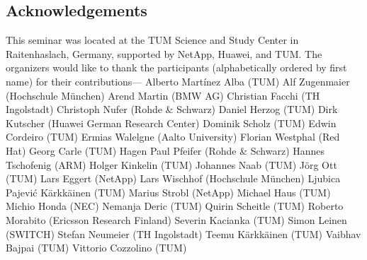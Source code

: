 
\subsection*{Acknowledgements}\label{sec:acknowledgement}

This seminar was located at the TUM Science and Study Center in Raitenhaslach,
Germany, supported by NetApp, Huawei, and TUM\@.  The organizers would like to
thank the participants (alphabetically ordered by first name) for their
contributions---%
Alberto Martínez Alba (TUM)
Alf Zugenmaier (Hochschule München)
Arend Martin (BMW AG)
Christian Facchi (TH Ingolstadt)
Christoph Nufer (Rohde \& Schwarz)
Daniel Herzog (TUM)
Dirk Kutscher (Huawei German Research Center)
Dominik Scholz (TUM)
Edwin Cordeiro (TUM)
Ermias Walelgne (Aalto University)
Florian Westphal (Red Hat)
Georg Carle (TUM)
Hagen Paul Pfeifer (Rohde \& Schwarz)
Hannes Tschofenig (ARM)
Holger Kinkelin (TUM)
Johannes Naab (TUM)
Jörg Ott (TUM)
Lars Eggert (NetApp)
Lars Wischhof (Hochschule München)
Ljubica Pajević Kärkkäinen (TUM)
Marius Strobl (NetApp)
Michael Haus (TUM)
Michio Honda (NEC)
Nemanja Deric (TUM)
Quirin Scheitle (TUM)
Roberto Morabito (Ericsson Research Finland)
Severin Kacianka (TUM)
Simon Leinen (SWITCH)
Stefan Neumeier (TH Ingolstadt)
Teemu Kärkkäinen (TUM)
Vaibhav Bajpai (TUM)
Vittorio Cozzolino (TUM)
